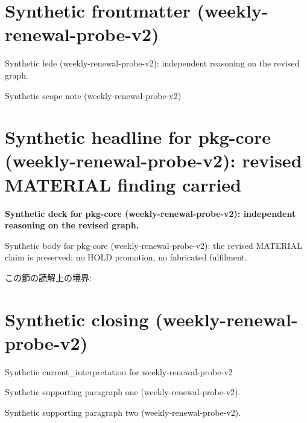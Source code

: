 \documentclass[lualatex,a4paper,10pt]{jlreq}
\begin{document}
\surveycover
\clearpage
\section*{Synthetic frontmatter (weekly-renewal-probe-v2)}
Synthetic lede (weekly-renewal-probe-v2): independent reasoning on the revised graph.

\begin{claimboundary}
\noindent Synthetic scope note (weekly-renewal-probe-v2)\par
\end{claimboundary}
\clearpage
\twocolumn
\section{Synthetic headline for pkg-core (weekly-renewal-probe-v2): revised MATERIAL finding carried}
\label{pkg:pkg-core}
\noindent\textbf{Synthetic deck for pkg-core (weekly-renewal-probe-v2): independent reasoning on the revised graph.} \cite{w2026-W33target-source}\par\medskip
\noindent Synthetic body for pkg-core (weekly-renewal-probe-v2): the revised MATERIAL claim is preserved; no HOLD promotion, no fabricated fulfilment.\par\medskip
\begin{claimboundary}
この節の読解上の境界: 
\end{claimboundary}
\clearpage
\onecolumn
\section{Synthetic closing (weekly-renewal-probe-v2)}
\label{sec:issue-summary}
\noindent Synthetic current\_interpretation for weekly-renewal-probe-v2\par\medskip
\noindent Synthetic supporting paragraph one (weekly-renewal-probe-v2).\par\medskip
\noindent Synthetic supporting paragraph two (weekly-renewal-probe-v2).\par\medskip
\clearpage
\onecolumn
\printbibliography[title={References / Source Notes}]
\end{document}
